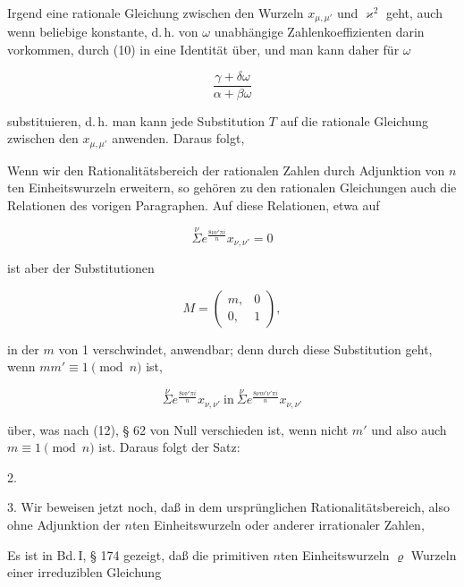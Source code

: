 Irgend eine rationale Gleichung zwischen den Wurzeln $x_{\mu,\mu'}$ und $\varkappa^2$ geht, auch wenn beliebige konstante, d.\,h. von $\omega$ unabhängige Zahlenkoeffizienten darin vorkommen, durch (10) in eine Identität über, und man kann daher für $\omega$

\[
\frac{\gamma + \delta\omega}{\alpha + \beta\omega}
\]

substituieren, d.\,h. man kann jede Substitution $T$ auf die rationale Gleichung zwischen den $x_{\mu,\mu'}$ anwenden. Daraus folgt, 

Wenn wir den Rationalitätsbereich der rationalen Zahlen durch Adjunktion von $n$ten Einheitswurzeln erweitern, so gehören zu den rationalen Gleichungen auch die  Relationen des vorigen Paragraphen. Auf diese Relationen, etwa auf

\[
\overset{\nu}{\Sigma} e^{\frac{8\nu\nu'\pi i}{n}} x_{\nu,\nu'} = 0
\]

ist aber  der Substitutionen

\[
M = \begin{pmatrix} m, & 0 \\ 0, & 1 \end{pmatrix},
\]

in der $m$ von 1 verschwindet, %
anwendbar; denn durch diese Substitution geht, wenn $mm' \equiv 1 \pmod{n}$ ist,

\[
\overset{\nu}{\Sigma} e^{\frac{8\nu\nu'\pi i}{n}} x_{\nu,\nu'} \ \text{in} \ \overset{\nu}{\Sigma} e^{\frac{8\nu m'\nu'\pi i}{n}} x_{\nu,\nu'}
\]

über, was nach (12), § 62 von Null verschieden ist, wenn nicht $m'$ und also auch $m \equiv 1 \pmod{n}$ ist. Daraus folgt der Satz:

2. 

3. Wir beweisen jetzt noch, daß in dem ursprünglichen Rationalitätsbereich, also ohne Adjunktion der $n$ten Einheitswurzeln oder anderer irrationaler Zahlen, 

Es ist in Bd.\,I, § 174 gezeigt, daß die primitiven $n$ten Einheitswurzeln $\varrho$ Wurzeln einer irreduziblen Gleichung

